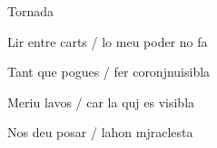 \documentclass[12pt]{article}
\begin{document}
\begin{estrofaExtra}%




\begin{tornada}

Tornada

\end{tornada}


\end{estrofaExtra}


\begin{estrofa}

 Lir entre carts / lo meu poder no fa

 Tant que pogues / fer coronjnuisibla

 Meriu lavos / car la quj es visibla

 Nos deu posar / lahon mjraclesta

\end{estrofa}
\end{document}
